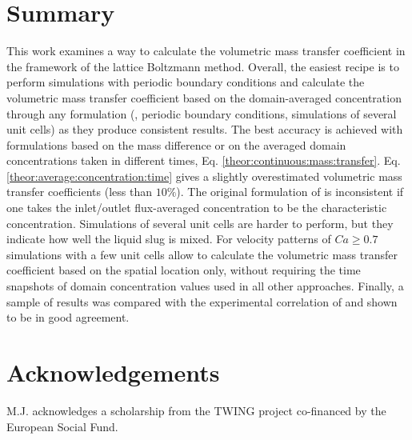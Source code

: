 \documentclass{article}
\begin{document}
\section{Summary}
This work examines a way to calculate the volumetric mass transfer coefficient in the framework of
the lattice Boltzmann method. Overall, the easiest recipe is to perform simulations 
with periodic boundary conditions
and calculate the volumetric mass transfer coefficient based on the
domain-averaged concentration through any formulation (\citeauthor{vanbaten-circular}, periodic boundary conditions, simulations of several unit cells) as they produce consistent results. The best accuracy
is achieved with formulations based on the mass difference or on the averaged domain concentrations
taken in different times, Eq. \ref{theor:continuous:mass:transfer}. Eq.
\ref{theor:average:concentration:time} gives a slightly overestimated volumetric mass transfer
coefficients (less than $10\%$). The original formulation of
\citet{vanbaten-circular} is inconsistent if one takes the inlet/outlet flux-averaged concentration
to be the characteristic concentration. Simulations of several unit cells are harder to perform, but they
indicate how well the liquid slug is mixed.  For velocity patterns of $Ca\geq
0.7$ simulations with a few unit cells allow to calculate the volumetric mass transfer
coefficient based on the spatial location only, without requiring the time snapshots of domain concentration values used in all other
approaches. Finally, a sample of results was
compared with the experimental correlation of \citet{yue-mass} and shown to be in good agreement. 

\section{Acknowledgements}
M.J. acknowledges a scholarship from the TWING project co-financed by the European Social Fund.
\end{document}

